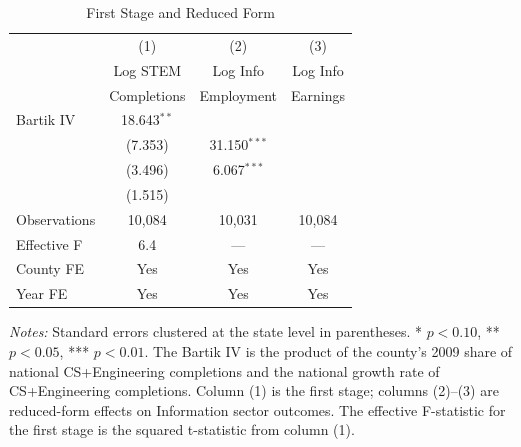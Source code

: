 \begin{table}[H]
\centering
\caption{First Stage and Reduced Form}
\label{tab:first_stage}
\begin{threeparttable}
\begin{tabular}{lccc}
\toprule
 & (1) & (2) & (3) \\
 & Log STEM & Log Info & Log Info \\
 & Completions & Employment & Earnings \\
\midrule
Bartik IV & 18.643$^{**}$ \\
  & (7.353) & 31.150$^{***}$ \\
  & (3.496) & 6.067$^{***}$ \\
  & (1.515) \\
\addlinespace
Observations & 10,084 & 10,031 & 10,084 \\
Effective F & 6.4 & --- & --- \\
County FE & Yes & Yes & Yes \\
Year FE & Yes & Yes & Yes \\
\bottomrule
\end{tabular}
\begin{tablenotes}[flushleft]
\small
\item \textit{Notes:} Standard errors clustered at the state level in parentheses. * $p<0.10$, ** $p<0.05$, *** $p<0.01$. The Bartik IV is the product of the county's 2009 share of national CS+Engineering completions and the national growth rate of CS+Engineering completions. Column (1) is the first stage; columns (2)--(3) are reduced-form effects on Information sector outcomes. The effective F-statistic for the first stage is the squared t-statistic from column (1).
\end{tablenotes}
\end{threeparttable}
\end{table}

